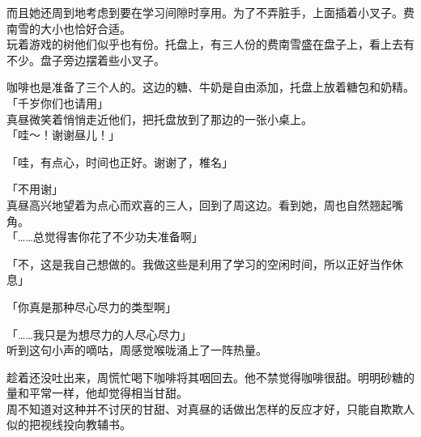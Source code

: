 而且她还周到地考虑到要在学习间隙时享用。为了不弄脏手，上面插着小叉子。费南雪的大小也恰好合适。\\

玩着游戏的树他们似乎也有份。托盘上，有三人份的费南雪盛在盘子上，看上去有不少。盘子旁边摆着些小叉子。

咖啡也是准备了三个人的。这边的糖、牛奶是自由添加，托盘上放着糖包和奶精。\\

「千岁你们也请用」\\

真昼微笑着悄悄走近他们，把托盘放到了那边的一张小桌上。\\

「哇～！谢谢昼儿！」

「哇，有点心，时间也正好。谢谢了，椎名」

「不用谢」\\

真昼高兴地望着为点心而欢喜的三人，回到了周这边。看到她，周也自然翘起嘴角。\\

「……总觉得害你花了不少功夫准备啊」

「不，这是我自己想做的。我做这些是利用了学习的空闲时间，所以正好当作休息」

「你真是那种尽心尽力的类型啊」

「……我只是为想尽力的人尽心尽力」\\

听到这句小声的嘀咕，周感觉喉咙涌上了一阵热量。

趁着还没吐出来，周慌忙喝下咖啡将其咽回去。他不禁觉得咖啡很甜。明明砂糖的量和平常一样，他却觉得相当甘甜。\\

周不知道对这种并不讨厌的甘甜、对真昼的话做出怎样的反应才好，只能自欺欺人似的把视线投向教辅书。
